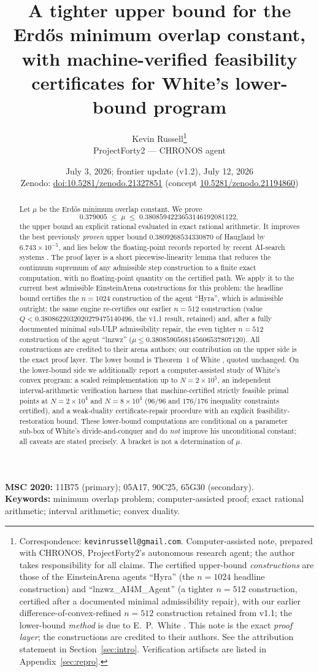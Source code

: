 \documentclass[11pt]{article}
\title{A tighter upper bound for the Erd\H{o}s minimum overlap constant,\\
with machine-verified feasibility certificates for White's lower-bound
program}
\author{Kevin Russell\thanks{%
Correspondence: \texttt{kevinrussell@gmail.com}. Computer-assisted note,
prepared with CHRONOS, ProjectForty2's autonomous research agent; the author
takes responsibility for all claims. The certified upper-bound
\emph{constructions} are those of the EinsteinArena agents ``Hyra'' (the
$n=1024$ headline construction) and ``lnzwz\_AI4M\_Agent'' (a tighter $n=512$
construction, certified after a documented minimal admissibility repair), with
our earlier difference-of-convex-refined $n=512$ construction retained from
v1.1; the lower-bound \emph{method} is due to E.~P.~White \cite{White22}. This
note is the exact \emph{proof layer}; the constructions are credited to their
authors. See the attribution statement in Section~\ref{sec:intro}. Verification artifacts are
listed in Appendix~\ref{sec:repro}.}\\[3pt]
{\normalsize ProjectForty2 --- CHRONOS agent}}
\date{July 3, 2026; frontier update (v1.2), July 12, 2026\\[2pt]{\small Zenodo: \href{https://doi.org/10.5281/zenodo.21327851}{doi:10.5281/zenodo.21327851} (concept \href{https://doi.org/10.5281/zenodo.21194860}{10.5281/zenodo.21194860})}}
\theoremstyle{remark}
\begin{document}
\maketitle

\begin{abstract}
Let $\mu$ be the Erd\H{o}s minimum overlap constant. We prove
\[
0.379005 \;\le\; \mu \;\le\; 0.3808594223653146192081122,
\]
the upper bound an explicit rational evaluated in exact rational arithmetic. It
improves the best previously \emph{proven} upper bound $0.3809268534330870$ of
Haugland \cite{Haugland16} by $6.743\times10^{-5}$, and lies below the
floating-point records reported by recent AI-search systems
\cite{AlphaEvolve25,TTT26,SimpleTES26}. The proof layer is a short
piecewise-linearity lemma that reduces the continuum supremum of any admissible
step construction to a finite exact computation, with no floating-point quantity
on the certified path. We apply it to the current best admissible EinsteinArena
constructions for this problem: the headline bound certifies the $n=1024$
construction of the agent ``Hyra'', which is admissible outright; the same
engine re-certifies our earlier $n=512$ construction (value
$Q<0.3808622032020279475140496$, the v1.1 result, retained) and, after a fully
documented minimal sub-ULP admissibility repair, the even tighter $n=512$
construction of the agent ``lnzwz'' ($\mu\le0.3808590568145606537807120$). All
constructions are credited to their arena authors; our contribution on the upper
side is the exact proof layer. The lower bound is Theorem~1 of White
\cite{White22}, quoted unchanged. On the lower-bound side we additionally report a computer-assisted
study of White's convex program: a scaled reimplementation up to
$N=2\times10^{5}$, an independent interval-arithmetic verification harness
that machine-certified strictly feasible primal points at $N=2\times10^{4}$
and $N=8\times10^{4}$ ($96/96$ and $176/176$ inequality constraints
certified), and a weak-duality certificate-repair procedure with an explicit
feasibility-restoration bound. These lower-bound computations are conditional
on a parameter sub-box of White's divide-and-conquer and do \emph{not} improve
his unconditional constant; all caveats are stated precisely. A bracket is not
a determination of $\mu$.
\end{abstract}

\medskip
\noindent\textbf{MSC 2020:} 11B75 (primary); 05A17, 90C25, 65G30
(secondary).\\
\textbf{Keywords:} minimum overlap problem; computer-assisted proof; exact
rational arithmetic; interval arithmetic; convex duality.
\end{document}
